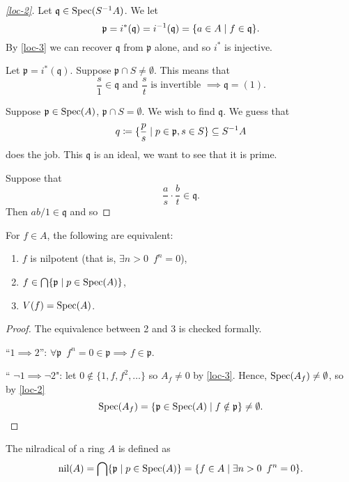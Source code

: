 \begin{proof}[\cref{loc-2}]
  Let $\mathfrak q \in \text{Spec}(S^{-1}A)$. We let
  \[ \mathfrak p = i^*(\mathfrak q) = i^{-1}(\mathfrak q) = \{a \in A \mathrel{|} f \in \mathfrak q \}.\]
  By \cref{loc-3} we can recover $\mathfrak q$ from $\mathfrak p$ alone, and so $i^*$ is injective.

  Let
  $\mathfrak p = i^* (\mathfrak q)$.
  Suppose
  $\mathfrak p \cap S \neq \emptyset$.
  This means that
  \[\frac{s}{1} \in \mathfrak q \text{ and } \frac{s}{t}  \text{ is invertible } \implies \mathfrak q = (1).\]

  Suppose $\mathfrak p \in \text{Spec}(A)$, $\mathfrak p \cap S = \emptyset$.
  We wish to find $\mathfrak q$. We guess that
  \[ q \coloneqq \{ \frac{p}{s} \mathrel{|} p \in \mathfrak p, s \in S \} \subseteq S^{-1}A\]
  does the job.
  This $\mathfrak q$ is an ideal, we want to see that it is prime.

  Suppose that
  \[ \frac{a}{s} \cdot \frac{b}{t} \in \mathfrak q .\]
  Then
  $ab / 1 \in \mathfrak q$
  and so
\end{proof}

\begin{corollary}
  For $f \in A$, the following are equivalent:
  \begin{enumerate}
  \item $f$ is nilpotent (that is, $\exists n > 0 \enspace f^n = 0$),
  \item $f \in \bigcap \{\mathfrak p \mathrel{|} p \in \text{Spec}(A) \}$,
  \item $V(f) = \text{Spec}(A)$.
  \end{enumerate}
\end{corollary}

\begin{proof}
  The equivalence between 2 and 3 is checked formally.

  ``$1 \implies 2$'': $\forall \mathfrak p \enspace f^n = 0 \in \mathfrak p \implies f \in \mathfrak p$.

  `` $\neg 1 \implies \neg 2$":
  let
  $0 \notin \{ 1, f, f^2, \dotsc \}$
  so $A_f \neq 0$ by \cref{loc-3}.
  Hence, $\text{Spec}(A_f) \neq \emptyset$, so by \cref{loc-2}
  \[ \text{Spec}(A_f) = \{ \mathfrak p \in \text{Spec}(A) \mathrel{|} f \notin \mathfrak p \} \neq \emptyset .\]
\end{proof}

\begin{df}
  The nilradical of a ring $A$ is defined as
  \[ \text{nil}(A) = \bigcap \{ \mathfrak p \mathrel{|} p \in \text{Spec}(A) \} = \{f \in A \mathrel{|} \exists n > 0 \enspace f^n = 0 \}.\]
\end{df}

